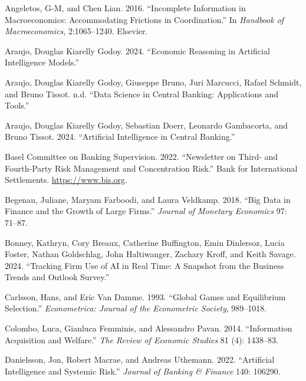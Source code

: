 \documentclass[
]{article}
\newlength{\cslhangindent}
\newlength{\cslentryspacingunit} %
\newenvironment{CSLReferences}[2] %
 {%
  \setlength{\parindent}{0pt}
  \ifodd #1
  \let\oldpar\par
  \def\par{\hangindent=\cslhangindent\oldpar}
  \fi
  \setlength{\parskip}{#2\cslentryspacingunit}
 }%
 {}
\theoremstyle{plain}
\theoremstyle{remark}
\begin{document}
\hypertarget{refs}{}
\begin{CSLReferences}{1}{0}
\leavevmode{}%
Angeletos, G-M, and Chen Lian. 2016. {``Incomplete Information in
Macroeconomics: Accommodating Frictions in Coordination.''} In
\emph{Handbook of Macroeconomics}, 2:1065--1240. Elsevier.

\leavevmode{}%
Araujo, Douglas Kiarelly Godoy. 2024. {``Economic Reasoning in
Artificial Intelligence Models.''}

\leavevmode{}%
Araujo, Douglas Kiarelly Godoy, Giuseppe Bruno, Juri Marcucci, Rafael
Schmidt, and Bruno Tissot. n.d. {``Data Science in Central Banking:
Applications and Tools.''}

\leavevmode{}%
Araujo, Douglas Kiarelly Godoy, Sebastian Doerr, Leonardo Gambacorta,
and Bruno Tissot. 2024. {``Artificial Intelligence in Central
Banking.''}

\leavevmode{}%
Basel Committee on Banking Supervision. 2022. {``{Newsletter on Third-
and Fourth-Party Risk Management and Concentration Risk}.''} {Bank for
International Settlements}. \url{https://www.bis.org}.

\leavevmode{}%
Begenau, Juliane, Maryam Farboodi, and Laura Veldkamp. 2018. {``Big Data
in Finance and the Growth of Large Firms.''} \emph{Journal of Monetary
Economics} 97: 71--87.

\leavevmode{}%
Bonney, Kathryn, Cory Breaux, Catherine Buffington, Emin Dinlersoz,
Lucia Foster, Nathan Goldschlag, John Haltiwanger, Zachary Kroff, and
Keith Savage. 2024. {``Tracking Firm Use of AI in Real Time: A Snapshot
from the Business Trends and Outlook Survey.''}

\leavevmode{}%
Carlsson, Hans, and Eric Van Damme. 1993. {``Global Games and
Equilibrium Selection.''} \emph{Econometrica: Journal of the Econometric
Society}, 989--1018.

\leavevmode{}%
Colombo, Luca, Gianluca Femminis, and Alessandro Pavan. 2014.
{``Information Acquisition and Welfare.''} \emph{The Review of Economic
Studies} 81 (4): 1438--83.

\leavevmode{}%
Danielsson, Jon, Robert Macrae, and Andreas Uthemann. 2022.
{``Artificial Intelligence and Systemic Risk.''} \emph{Journal of
Banking \& Finance} 140: 106290.


\end{CSLReferences}
\end{document}
